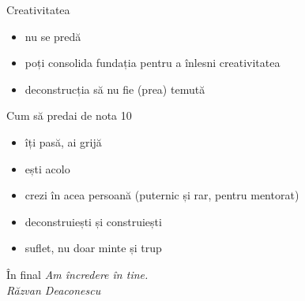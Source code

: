 \documentclass{simple}
\begin{document}
\begin{frame}{Creativitatea}
  \begin{itemize}
    \pause
    \item nu se predă
    \pause
    \item poți consolida fundația pentru a înlesni creativitatea
    \pause
    \item deconstrucția să nu fie (prea) temută
  \end{itemize}
\end{frame}

\begin{frame}{Cum să predai de nota 10}
  \begin{itemize}
    \pause
    \item îți pasă, ai grijă
    \pause
    \item ești acolo
    \pause
    \item crezi în acea persoană (puternic și rar, pentru mentorat)
    \pause
    \item deconstruiești și construiești
    \pause
    \item suflet, nu doar minte și trup
  \end{itemize}
\end{frame}

\begin{frame}{În final}
  \pause
  \centering
  \LARGE{\textit{Am încredere în tine.}} \\
  \vspace{3mm}
  \hfill \normalsize{\textit{Răzvan Deaconescu}} \\
\end{frame}
\end{document}
